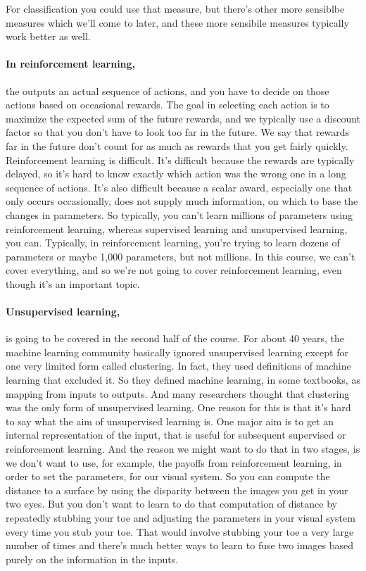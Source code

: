 \begin{multicols}{2}
\begin{footnotesize}
For classification you could use that measure, but there's other more sensiblbe measures which we'll come to later, and these more sensibile measures typically work better as well.

\paragraph{In reinforcement learning,} the outputs an actual sequence of actions, and you have to decide on those actions based on occasional rewards. The goal in selecting each action is to maximize the expected sum of the future rewards, and we typically use a discount factor so that you don't have to look too far in the future. We say that rewards far in the future don't count for as much as rewards that you get fairly quickly. Reinforcement learning is difficult. It's difficult because the rewards are typically delayed, so it's hard to know exactly which action was the wrong one in a long sequence of actions. It's also difficult because a scalar award, especially one that only occurs occasionally, does not supply much information, on which to base the changes in parameters. So typically, you can't learn millions of parameters using reinforcement learning, whereas supervised learning and unsupervised learning, you can. Typically, in reinforcement learning, you're trying to learn dozens of parameters or maybe 1,000 parameters, but not millions. In this course, we can't cover everything, and so we're not going to cover reinforcement learning, even though it's an important topic.

\paragraph{Unsupervised learning,} is going to be covered in the second half of the course. For about 40 years, the machine learning community basically ignored unsupervised learning except for one very limited form called clustering. In fact, they used definitions of machine learning that excluded it. So they defined machine learning, in some textbooks, as mapping from inputs to outputs. And many researchers thought that clustering was the only form of unsupervised learning. One reason for this is that it's hard to say what the aim of unsupervised learning is. One major aim is to get an internal representation of the input, that is useful for subsequent supervised or reinforcement learning. And the reason we might want to do that in two stages, is we don't want to use, for example, the payoffs from reinforcement learning, in order to set the parameters, for our visual system. So you can compute the distance to a surface by using the disparity between the images you get in your two eyes. But you don't want to learn to do that computation of distance by repeatedly stubbing your toe and adjusting the parameters in your visual system every time you stub your toe. That would involve stubbing your toe a very large number of times and there's much better ways to learn to fuse two images based purely on the information in the inputs.


\end{footnotesize}
\end{multicols}
